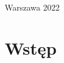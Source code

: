 \documentclass[11pt]{article}
\begin{document}
\begin{titlepage}

	



	
	
	 
	

	\vspace*{\fill}
	{Warszawa 2022 } %
\end{titlepage}



\section{Wstęp}
\end{document}
